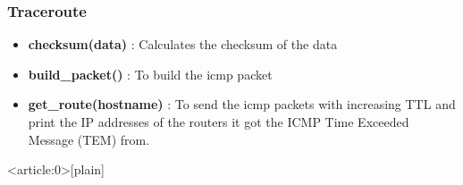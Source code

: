 \documentclass[aspectratio=169]{beamer}
\begin{document}
\begin{frame}
\frametitle{Traceroute}

\begin{itemize}
    \item \textbf{checksum(data)} : Calculates the checksum of the data
    \item \textbf{build\_packet()} : To build the icmp packet
    \item \textbf{get\_route(hostname)} : To send the icmp packets with increasing TTL and print the IP addresses of the routers it got the ICMP Time Exceeded Message (TEM) from.
    
\end{itemize}

\end{frame}

{ %
    \begin{frame}<article:0>[plain]
     \end{frame}
}
\end{document}

